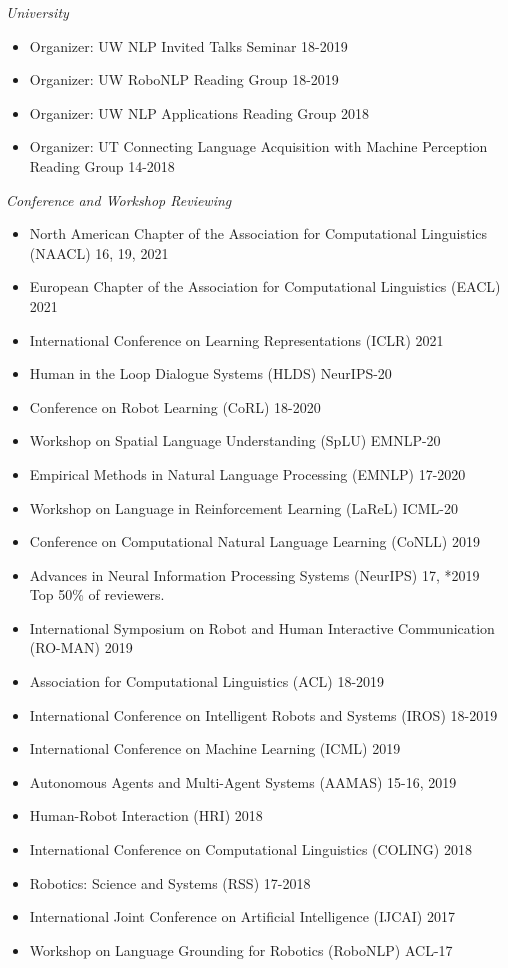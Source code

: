\documentclass{res}
\begin{document}
\begin{resume}
{\sl University}
\begin{itemize}
    \item Organizer: UW NLP Invited Talks Seminar \hfill 18-2019
    \item Organizer: UW RoboNLP Reading Group \hfill 18-2019
    \item Organizer: UW NLP Applications Reading Group \hfill 2018
    \item Organizer: UT Connecting Language Acquisition with Machine Perception Reading Group \hfill 14-2018
  \end{itemize}

{\sl Conference and Workshop Reviewing}
  \begin{itemize}
    \item North American Chapter of the Association for Computational Linguistics (NAACL) \hfill 16, 19, 2021
    \item European Chapter of the Association for Computational Linguistics (EACL) \hfill 2021
    \item International Conference on Learning Representations (ICLR) \hfill 2021
    \item Human in the Loop Dialogue Systems (HLDS) \hfill NeurIPS-20
    \item Conference on Robot Learning (CoRL) \hfill 18-2020
    \item Workshop on Spatial Language Understanding (SpLU) \hfill EMNLP-20
    \item Empirical Methods in Natural Language Processing (EMNLP) \hfill 17-2020
    \item Workshop on Language in Reinforcement Learning (LaReL) \hfill ICML-20
    \item Conference on Computational Natural Language Learning (CoNLL) \hfill 2019
    \item Advances in Neural Information Processing Systems (NeurIPS) \hfill 17, *2019
    \\ {\footnotesize *Top 50\% of reviewers.}
    \item International Symposium on Robot and Human Interactive Communication (RO-MAN) \hfill 2019
    \item Association for Computational Linguistics (ACL) \hfill 18-2019
    \item International Conference on Intelligent Robots and Systems (IROS) \hfill 18-2019
    \item International Conference on Machine Learning (ICML) \hfill 2019
    \item Autonomous Agents and Multi-Agent Systems (AAMAS) \hfill 15-16, 2019
    \item Human-Robot Interaction (HRI) \hfill 2018
    \item International Conference on Computational Linguistics (COLING) \hfill 2018
    \item Robotics: Science and Systems (RSS) \hfill 17-2018
    \item International Joint Conference on Artificial Intelligence (IJCAI) \hfill 2017
    \item Workshop on Language Grounding for Robotics (RoboNLP) \hfill ACL-17
  \end{itemize}


\end{resume}
\end{document}
